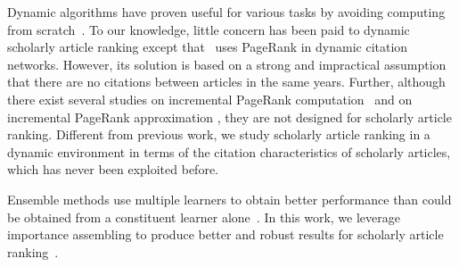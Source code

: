 Dynamic algorithms have proven useful for various tasks by avoiding computing from scratch~\cite{RamalingamR93}.
To our knowledge, little concern has been paid to dynamic scholarly article ranking except that~\cite{GhoshKHLL11} uses PageRank in dynamic citation networks. However, its solution is based on a strong and impractical assumption that there are no citations between articles in the same years.
Further, although there exist several studies on incremental PageRank computation~\cite{DesikanPSK05,AbiteboulPC03,WuR09} and on incremental PageRank approximation \cite{BahmaniCG10,BahmaniKMU12}, they are not designed for scholarly article ranking.
%
Different from previous work, we study scholarly article ranking in a dynamic environment in terms of
the citation characteristics of scholarly articles, which has never been exploited before.


Ensemble methods use multiple learners to obtain better performance than could be obtained from a constituent learner alone~\cite{zhihua-book}.
In this work, we leverage  importance assembling  to produce better and robust results for scholarly article ranking~\cite{zhihua-book,wsdmcup,DuanAMHH16}.
